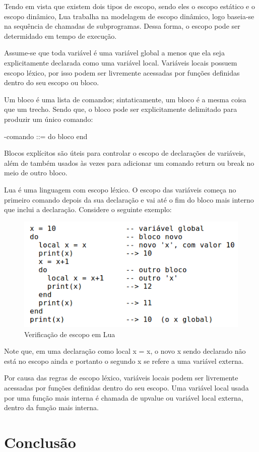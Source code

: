 \documentclass[
	12pt,				%
	openright,			%
	twoside,			%
	a4paper,			%
	english,			%
	brazil,				%
	]{abntex2}
\begin{document}
Tendo em vista que existem dois tipos de escopo, sendo eles o escopo estático e o escopo dinâmico, Lua trabalha na modelagem de escopo dinâmico, logo baseia-se na sequência de chamadas de subprogramas. Dessa forma, o escopo pode ser determidado em tempo de execução.

Assume-se que toda variável é uma variável global a menos que ela seja explicitamente declarada como uma variável local. Variáveis locais possuem escopo léxico, por isso podem ser livremente acessadas por funções definidas dentro do seu escopo ou bloco.

Um bloco é uma lista de comandos; sintaticamente, um bloco é a mesma coisa que um trecho. Sendo que, o bloco pode ser explicitamente delimitado para produzir um único comando:

-comando ::= do bloco end

Blocos explícitos são úteis para controlar o escopo de declarações de variáveis, além de também usados às vezes para adicionar um comando return ou break no meio de outro bloco.

Lua é uma linguagem com escopo léxico. O escopo das variáveis começa no primeiro comando depois da sua declaração e vai até o fim do bloco mais interno que inclui a declaração. Considere o seguinte exemplo:

\begin{figure}[!htb]
	\centering
	\includegraphics[width=0.5\linewidth]{imagens/imagem3.png}
	\caption{Verificação de escopo em Lua}
\end{figure}

Note que, em uma declaração como local x = x, o novo x sendo declarado não está no escopo ainda e portanto o segundo x se refere a uma variável externa.

Por causa das regras de escopo léxico, variáveis locais podem ser livremente acessadas por funções definidas dentro do seu escopo. Uma variável local usada por uma função mais interna é chamada de upvalue ou variável local externa, dentro da função mais interna.



\chapter{Conclusão}
\cite{Sebesta}
\cite{Valentim:2013:Online}
\end{document}
